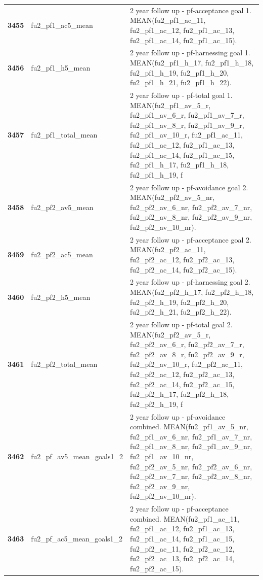\documentclass[
  letterpaper,
  DIV=11,
  numbers=noendperiod]{scrartcl}
\begin{document}
\begin{longtable}[t]{>{}cll}
\textbf{3455} & fu2\_pf1\_ac5\_mean & 2 year follow up - pf-acceptance goal 1. MEAN(fu2\_pf1\_ac\_11, fu2\_pf1\_ac\_12, fu2\_pf1\_ac\_13, fu2\_pf1\_ac\_14, fu2\_pf1\_ac\_15).\\
\addlinespace
\textbf{3456} & fu2\_pf1\_h5\_mean & 2 year follow up - pf-harnessing goal 1. MEAN(fu2\_pf1\_h\_17, fu2\_pf1\_h\_18, fu2\_pf1\_h\_19, fu2\_pf1\_h\_20, fu2\_pf1\_h\_21, fu2\_pf1\_h\_22).\\
\textbf{3457} & fu2\_pf1\_total\_mean & 2 year follow up - pf-total goal 1. MEAN(fu2\_pf1\_av\_5\_r, fu2\_pf1\_av\_6\_r, fu2\_pf1\_av\_7\_r, fu2\_pf1\_av\_8\_r, fu2\_pf1\_av\_9\_r, fu2\_pf1\_av\_10\_r, fu2\_pf1\_ac\_11, fu2\_pf1\_ac\_12, fu2\_pf1\_ac\_13, fu2\_pf1\_ac\_14, fu2\_pf1\_ac\_15, fu2\_pf1\_h\_17, fu2\_pf1\_h\_18, fu2\_pf1\_h\_19, f\\
\textbf{3458} & fu2\_pf2\_av5\_mean & 2 year follow up - pf-avoidance goal 2. MEAN(fu2\_pf2\_av\_5\_nr, fu2\_pf2\_av\_6\_nr, fu2\_pf2\_av\_7\_nr, fu2\_pf2\_av\_8\_nr, fu2\_pf2\_av\_9\_nr, fu2\_pf2\_av\_10\_nr).\\
\textbf{3459} & fu2\_pf2\_ac5\_mean & 2 year follow up - pf-acceptance goal 2. MEAN(fu2\_pf2\_ac\_11, fu2\_pf2\_ac\_12, fu2\_pf2\_ac\_13, fu2\_pf2\_ac\_14, fu2\_pf2\_ac\_15).\\
\textbf{3460} & fu2\_pf2\_h5\_mean & 2 year follow up - pf-harnessing goal 2. MEAN(fu2\_pf2\_h\_17, fu2\_pf2\_h\_18, fu2\_pf2\_h\_19, fu2\_pf2\_h\_20, fu2\_pf2\_h\_21, fu2\_pf2\_h\_22).\\
\addlinespace
\textbf{3461} & fu2\_pf2\_total\_mean & 2 year follow up - pf-total goal 2. MEAN(fu2\_pf2\_av\_5\_r, fu2\_pf2\_av\_6\_r, fu2\_pf2\_av\_7\_r, fu2\_pf2\_av\_8\_r, fu2\_pf2\_av\_9\_r, fu2\_pf2\_av\_10\_r, fu2\_pf2\_ac\_11, fu2\_pf2\_ac\_12, fu2\_pf2\_ac\_13, fu2\_pf2\_ac\_14, fu2\_pf2\_ac\_15, fu2\_pf2\_h\_17, fu2\_pf2\_h\_18, fu2\_pf2\_h\_19, f\\
\textbf{3462} & fu2\_pf\_av5\_mean\_goals1\_2 & 2 year follow up - pf-avoidance combined. MEAN(fu2\_pf1\_av\_5\_nr, fu2\_pf1\_av\_6\_nr, fu2\_pf1\_av\_7\_nr, fu2\_pf1\_av\_8\_nr, fu2\_pf1\_av\_9\_nr, fu2\_pf1\_av\_10\_nr, fu2\_pf2\_av\_5\_nr, fu2\_pf2\_av\_6\_nr, fu2\_pf2\_av\_7\_nr, fu2\_pf2\_av\_8\_nr, fu2\_pf2\_av\_9\_nr, fu2\_pf2\_av\_10\_nr).\\
\textbf{3463} & fu2\_pf\_ac5\_mean\_goals1\_2 & 2 year follow up - pf-acceptance combined. MEAN(fu2\_pf1\_ac\_11, fu2\_pf1\_ac\_12, fu2\_pf1\_ac\_13, fu2\_pf1\_ac\_14, fu2\_pf1\_ac\_15, fu2\_pf2\_ac\_11, fu2\_pf2\_ac\_12, fu2\_pf2\_ac\_13, fu2\_pf2\_ac\_14, fu2\_pf2\_ac\_15).\\

\end{longtable}
\end{document}
